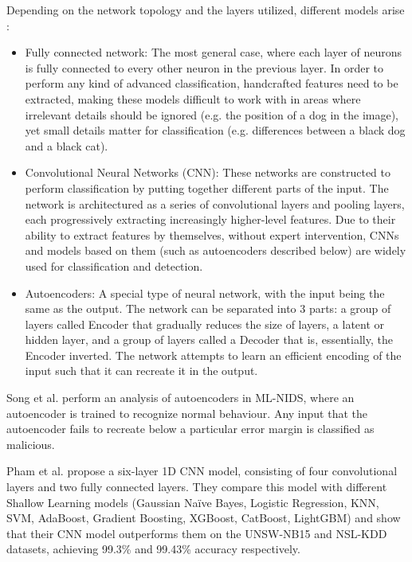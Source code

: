 Depending on the network topology and the layers utilized, different models arise \cite{deep_learning}:
\begin{itemize}
    \item Fully connected network: The most general case, where each layer of neurons is fully connected to every other neuron in the previous layer. In order to perform any kind of advanced classification, handcrafted features need to be extracted, making these models difficult to work with in areas where irrelevant details should be ignored (e.g. the position of a dog in the image), yet small details matter for classification (e.g. differences between a black dog and a black cat).
    \item Convolutional Neural Networks (CNN): These networks are constructed to perform classification by putting together different parts of the input. The network is architectured as a series of convolutional layers and pooling layers, each progressively extracting increasingly higher-level features. Due to their ability to extract features by themselves, without expert intervention, CNNs and models based on them (such as autoencoders described below) are widely used for classification and detection.
    \item Autoencoders: A special type of neural network, with the input being the same as the output. The network can be separated into 3 parts: a group of layers called Encoder that gradually reduces the size of layers, a latent or hidden layer, and a group of layers called a Decoder that is, essentially, the Encoder inverted. The network attempts to learn an efficient encoding of the input such that it can recreate it in the output. 
\end{itemize}

Song et al. \cite{analysis_autoencoders} perform an analysis of autoencoders in ML-NIDS, where an autoencoder is trained to recognize normal behaviour. Any input that the autoencoder fails to recreate below a particular error margin is classified as malicious. 

Pham et al. \cite{nids_cnn} propose a six-layer 1D CNN model, consisting of four convolutional layers and two fully connected layers. They compare this model with different Shallow Learning models (Gaussian Naïve Bayes, Logistic Regression, KNN, SVM, AdaBoost, Gradient Boosting, XGBoost, CatBoost, LightGBM) and show that their CNN model outperforms them on the UNSW-NB15\cite{unsw-nb15} and NSL-KDD \cite{nsl-kdd} datasets, achieving 99.3\% and 99.43\% accuracy respectively.
